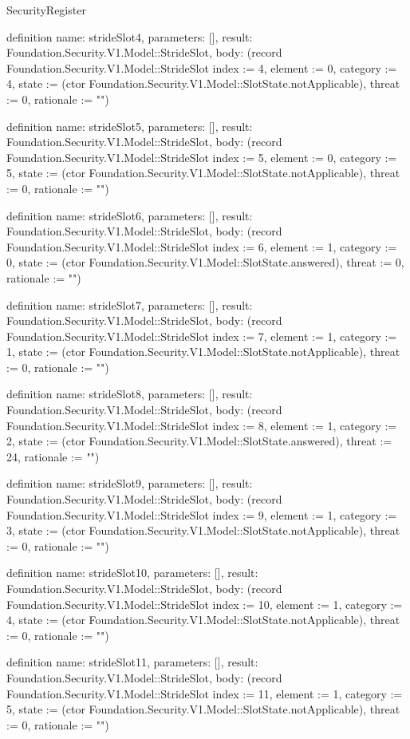 \begin{lexlean}{SecurityRegister}
\begin{semanticmodule}
definition{
  name: strideSlot4,
  parameters: [],
  result: Foundation.Security.V1.Model::StrideSlot,
  body: (record Foundation.Security.V1.Model::StrideSlot {index := 4, element := 0, category := 4, state := (ctor Foundation.Security.V1.Model::SlotState.notApplicable), threat := 0, rationale := ""})
}

definition{
  name: strideSlot5,
  parameters: [],
  result: Foundation.Security.V1.Model::StrideSlot,
  body: (record Foundation.Security.V1.Model::StrideSlot {index := 5, element := 0, category := 5, state := (ctor Foundation.Security.V1.Model::SlotState.notApplicable), threat := 0, rationale := ""})
}

definition{
  name: strideSlot6,
  parameters: [],
  result: Foundation.Security.V1.Model::StrideSlot,
  body: (record Foundation.Security.V1.Model::StrideSlot {index := 6, element := 1, category := 0, state := (ctor Foundation.Security.V1.Model::SlotState.answered), threat := 0, rationale := ""})
}

definition{
  name: strideSlot7,
  parameters: [],
  result: Foundation.Security.V1.Model::StrideSlot,
  body: (record Foundation.Security.V1.Model::StrideSlot {index := 7, element := 1, category := 1, state := (ctor Foundation.Security.V1.Model::SlotState.notApplicable), threat := 0, rationale := ""})
}

definition{
  name: strideSlot8,
  parameters: [],
  result: Foundation.Security.V1.Model::StrideSlot,
  body: (record Foundation.Security.V1.Model::StrideSlot {index := 8, element := 1, category := 2, state := (ctor Foundation.Security.V1.Model::SlotState.answered), threat := 24, rationale := ""})
}

definition{
  name: strideSlot9,
  parameters: [],
  result: Foundation.Security.V1.Model::StrideSlot,
  body: (record Foundation.Security.V1.Model::StrideSlot {index := 9, element := 1, category := 3, state := (ctor Foundation.Security.V1.Model::SlotState.notApplicable), threat := 0, rationale := ""})
}

definition{
  name: strideSlot10,
  parameters: [],
  result: Foundation.Security.V1.Model::StrideSlot,
  body: (record Foundation.Security.V1.Model::StrideSlot {index := 10, element := 1, category := 4, state := (ctor Foundation.Security.V1.Model::SlotState.notApplicable), threat := 0, rationale := ""})
}

definition{
  name: strideSlot11,
  parameters: [],
  result: Foundation.Security.V1.Model::StrideSlot,
  body: (record Foundation.Security.V1.Model::StrideSlot {index := 11, element := 1, category := 5, state := (ctor Foundation.Security.V1.Model::SlotState.notApplicable), threat := 0, rationale := ""})
}


\end{semanticmodule}
\end{lexlean}

